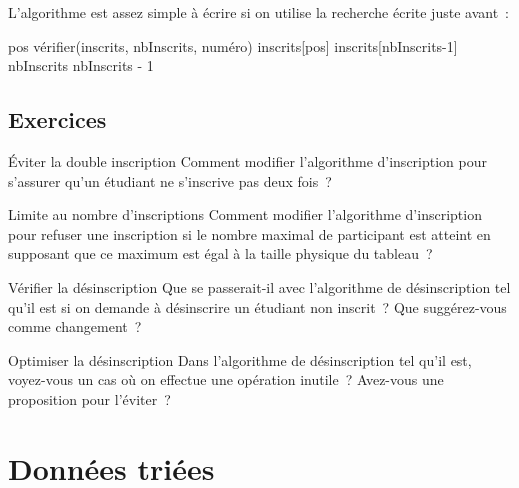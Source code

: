 			L’algorithme est assez simple à écrire
			si on utilise la recherche écrite juste avant~:
			
			\begin{LDA}
					\Let pos \Gets vérifier(inscrits, nbInscrits, numéro)
					\Let inscrits[pos] \Gets inscrits[nbInscrits-1]
					\Let nbInscrits \Gets nbInscrits - 1					
				\EndAlgo
			\end{LDA}
			
		\subsection{Exercices}
			
			\begin{Exercice}{Éviter la double inscription}
				Comment modifier l’algorithme d’inscription
				pour s’assurer qu’un étudiant ne s’inscrive pas deux fois~?
			\end{Exercice}

			\begin{Exercice}{Limite au nombre d’inscriptions}
				Comment modifier l’algorithme d’inscription
				pour refuser une inscription si le nombre maximal
				de participant est atteint
				en supposant que ce maximum est égal à la taille physique du tableau~?
			\end{Exercice}

			\begin{Exercice}{Vérifier la désinscription}
				Que se passerait-il avec l’algorithme
				de désinscription tel qu’il est
				si on demande à désinscrire un étudiant non inscrit~?
				Que suggérez-vous comme changement~?
			\end{Exercice}

			\begin{Exercice}{Optimiser la désinscription}
				Dans l’algorithme de désinscription tel qu’il est,
				voyez-vous un cas où on effectue une opération inutile~?
				Avez-vous une proposition pour l’éviter~?
			\end{Exercice}

	\section{Données triées} 

